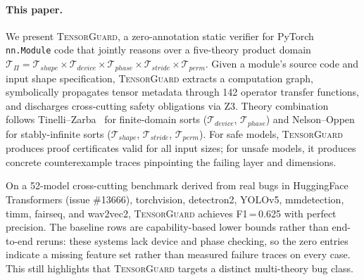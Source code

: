 \documentclass[10pt]{article}
\newcommand{\tguard}{\textsc{TensorGuard}}
\newcommand{\Tshape}{\mathcal{T}_{\mathit{shape}}}
\newcommand{\Tdevice}{\mathcal{T}_{\mathit{device}}}
\newcommand{\Tphase}{\mathcal{T}_{\mathit{phase}}}
\newcommand{\Tstride}{\mathcal{T}_{\mathit{stride}}}
\newcommand{\Tperm}{\mathcal{T}_{\mathit{perm}}}
\newcommand{\Tprod}{\mathcal{T}_{\Pi}}
\theoremstyle{plain}
\theoremstyle{definition}
\theoremstyle{remark}
\begin{document}
\paragraph{This paper.}
We present \tguard{}, a zero-annotation static verifier for PyTorch
\texttt{nn.Module} code that jointly reasons over a five-theory
product domain $\Tprod = \Tshape \times \Tdevice \times \Tphase
\times \Tstride \times \Tperm$.  Given a module's source code and
input shape specification, \tguard{} extracts a computation graph,
symbolically propagates tensor metadata through 142 operator transfer
functions, and discharges cross-cutting safety obligations via Z3.
Theory combination follows Tinelli--Zarba~\cite{tinelli03} for
finite-domain sorts ($\Tdevice$, $\Tphase$) and
Nelson--Oppen~\cite{nelsonoppen79} for stably-infinite sorts
($\Tshape$, $\Tstride$, $\Tperm$).  For safe models, \tguard{}
produces proof certificates valid for all input sizes; for unsafe
models, it produces concrete counterexample traces pinpointing the
failing layer and dimensions.

On a 52-model cross-cutting benchmark derived from real bugs in
HuggingFace Transformers (issue \#13666), torchvision, detectron2,
YOLOv5, mmdetection, timm, fairseq, and wav2vec2, \tguard{} achieves
F1\,=\,0.625 with perfect precision. The baseline rows are
capability-based lower bounds rather than end-to-end reruns: these
systems lack device and phase checking, so the zero entries indicate a
missing feature set rather than measured failure traces on every case.
This still highlights that \tguard{} targets a distinct multi-theory
bug class.
\end{document}
